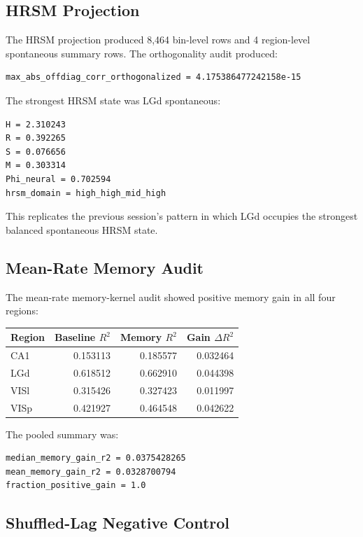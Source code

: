 \subsection{HRSM Projection}

The HRSM projection produced 8,464 bin-level rows and 4 region-level spontaneous summary rows. The orthogonality audit produced:

\begin{verbatim}
max_abs_offdiag_corr_orthogonalized = 4.175386477242158e-15
\end{verbatim}

The strongest HRSM state was LGd spontaneous:

\begin{verbatim}
H = 2.310243
R = 0.392265
S = 0.076656
M = 0.303314
Phi_neural = 0.702594
hrsm_domain = high_high_mid_high
\end{verbatim}

This replicates the previous session's pattern in which LGd occupies the strongest balanced spontaneous HRSM state.

\subsection{Mean-Rate Memory Audit}

The mean-rate memory-kernel audit showed positive memory gain in all four regions:

\begin{center}
\begin{tabular}{lrrr}
\hline
Region & Baseline \(R^2\) & Memory \(R^2\) & Gain \(\Delta R^2\) \\
\hline
CA1 & 0.153113 & 0.185577 & 0.032464 \\
LGd & 0.618512 & 0.662910 & 0.044398 \\
VISl & 0.315426 & 0.327423 & 0.011997 \\
VISp & 0.421927 & 0.464548 & 0.042622 \\
\hline
\end{tabular}
\end{center}

The pooled summary was:

\begin{verbatim}
median_memory_gain_r2 = 0.0375428265
mean_memory_gain_r2 = 0.0328700794
fraction_positive_gain = 1.0
\end{verbatim}

\subsection{Shuffled-Lag Negative Control}

